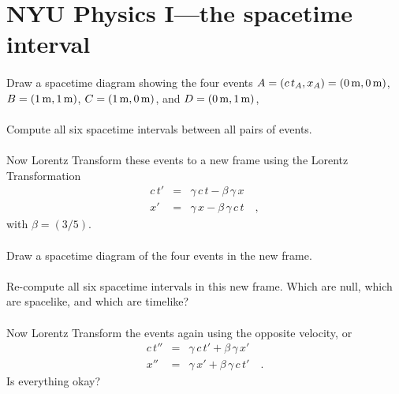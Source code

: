 \documentclass[12pt]{article}
\begin{document}
\section*{NYU Physics I---the spacetime interval}

\paragraph{\theproblem}%
Draw a spacetime diagram showing the four events
$A=(c\,t_A,x_A)=(0\,\mathrm{m},0\,\mathrm{m})$, $B=(1\,\mathrm{m},1\,\mathrm{m})$, $C=(1\,\mathrm{m},0\,\mathrm{m})$,
and $D=(0\,\mathrm{m},1\,\mathrm{m})$,

\paragraph{\theproblem}%
Compute all six spacetime intervals between all pairs of events.

\paragraph{\theproblem}%
Now Lorentz Transform these events to a new frame using the Lorentz
Transformation
\begin{eqnarray}\displaystyle
c\,t' & = & \gamma\,c\,t - \beta\,\gamma\,   x \nonumber\\
   x' & = & \gamma\,   x - \beta\,\gamma\,c\,t \quad ,
\end{eqnarray}
with $\beta=(3/5)$.

\paragraph{\theproblem}%
Draw a spacetime diagram of the four events in the new frame.

\paragraph{\theproblem}%
Re-compute all six spacetime intervals in this new frame.  Which are
null, which are spacelike, and which are timelike?

\paragraph{\theproblem}%
Now Lorentz Transform the events again using the opposite velocity, or
\begin{eqnarray}\displaystyle
c\,t'' & = & \gamma\,c\,t' + \beta\,\gamma\,   x' \nonumber\\
   x'' & = & \gamma\,   x' + \beta\,\gamma\,c\,t' \quad .
\end{eqnarray}
Is everything okay?
\end{document}
